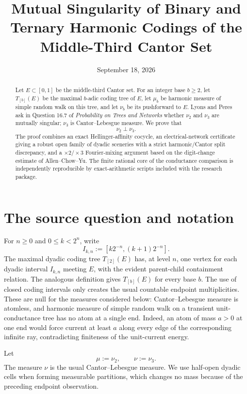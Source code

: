 \documentclass[11pt]{article}
\title{Mutual Singularity of Binary and Ternary Harmonic Codings of the Middle-Third Cantor Set}
\author{}
\date{September 18, 2026}
\theoremstyle{remark}
\begin{document}
\maketitle

\begin{abstract}
Let $E\subset[0,1]$ be the middle-third Cantor set.  For an integer base $b\ge2$, let $T_{[b]}(E)$ be the maximal $b$-adic coding tree of $E$, let $\mu_b$ be harmonic measure of simple random walk on this tree, and let $\nu_b$ be its pushforward to $E$.  Lyons and Peres ask in Question 16.7 of \emph{Probability on Trees and Networks} whether $\nu_2$ and $\nu_3$ are mutually singular; $\nu_3$ is Cantor--Lebesgue measure.  We prove that
\[
   \nu_2\perp\nu_3.
\]
The proof combines an exact Hellinger-affinity cocycle, an electrical-network certificate giving a robust open family of dyadic sceneries with a strict harmonic/Cantor split discrepancy, and a $\times2/\times3$ Fourier-mixing argument based on the digit-change estimate of Allen--Chow--Yu.  The finite rational core of the conductance comparison is independently reproducible by exact-arithmetic scripts included with the research package.
\end{abstract}

\section{The source question and notation}

For $n\ge0$ and $0\le k<2^n$, write
\[
 I_{k,n}:=[k2^{-n},(k+1)2^{-n}].
\]
The maximal dyadic coding tree $T_{[2]}(E)$ has, at level $n$, one vertex for each dyadic interval $I_{k,n}$ meeting $E$, with the evident parent-child containment relation.  The analogous definition gives $T_{[b]}(E)$ for every base $b$.  The use of closed coding intervals only creates the usual countable endpoint multiplicities.  These are null for the measures considered below: Cantor--Lebesgue measure is atomless, and harmonic measure of simple random walk on a transient unit-conductance tree has no atom at a single end.  Indeed, an atom of mass $a>0$ at one end would force current at least $a$ along every edge of the corresponding infinite ray, contradicting finiteness of the unit-current energy.

Let
\[
   \mu:=\nu_2,\qquad \nu:=\nu_3.
\]
The measure $\nu$ is the usual Cantor--Lebesgue measure.  We use half-open dyadic cells when forming measurable partitions, which changes no mass because of the preceding endpoint observation.
\end{document}
